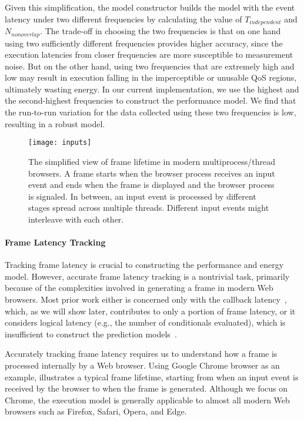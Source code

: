 Given this simplification, the model constructor builds the model with the event latency under two different frequencies by calculating the value of $T_{independent}$ and $N_{nonoverlap}$. The trade-off in choosing the two frequencies is that on one hand using two sufficiently different frequencies provides higher accuracy, since the execution latencies from closer frequencies are more susceptible to measurement noise. But on the other hand, using two frequencies that are extremely high and low may result in execution falling in the  imperceptible or unusable QoS regions, ultimately wasting energy. In our current implementation, we use the highest and the second-highest frequencies to construct the performance model. We find that the run-to-run variation for the data collected using these two frequencies is low, resulting in a robust model.

\begin{figure}[t]
  \centering
  \texttt{[image: inputs]}
  \caption{The simplified view of frame lifetime in modern multiprocess/thread browsers. A frame starts when the browser process receives an input event and ends when the frame is displayed and the browser process is signaled. In between, an input event is processed by different stages spread across multiple threads. Different input events might interleave with each other.}
  \label{fig:inputs}
\end{figure}

\paragraph{Frame Latency Tracking} Tracking frame latency is crucial to constructing the performance and energy model. However, accurate frame latency tracking is a nontrivial task, primarily because of the complexities involved in generating a frame in modern Web browsers. Most prior work either is concerned only with the callback latency~\cite{ebs,efetch}, which, as we will show later, contributes to only a portion of frame latency, or it considers logical latency (e.g., the number of conditionals evaluated), which is insufficient to construct the prediction models~\cite{eventbreak}.

Accurately tracking frame latency requires us to understand how a frame is processed internally by a Web browser. Using Google Chrome browser as an example,  illustrates a typical frame lifetime, starting from when an input event is received by the browser to when the frame is generated. Although we focus on Chrome, the execution model is generally applicable to almost all modern Web browsers such as Firefox, Safari, Opera, and Edge.

